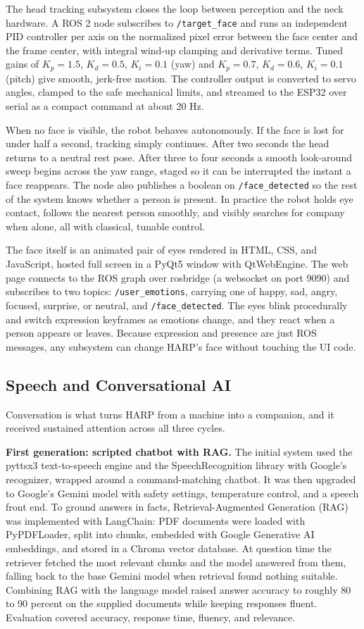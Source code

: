 \documentclass[11pt,a4paper]{article}
\begin{document}
The head tracking subsystem closes the loop between perception and the neck hardware. A ROS 2 node subscribes to \texttt{/target\_face} and runs an independent PID controller per axis on the normalized pixel error between the face center and the frame center, with integral wind-up clamping and derivative terms. Tuned gains of $K_p = 1.5$, $K_d = 0.5$, $K_i = 0.1$ (yaw) and $K_p = 0.7$, $K_d = 0.6$, $K_i = 0.1$ (pitch) give smooth, jerk-free motion. The controller output is converted to servo angles, clamped to the safe mechanical limits, and streamed to the ESP32 over serial as a compact command at about 20 Hz.

When no face is visible, the robot behaves autonomously. If the face is lost for under half a second, tracking simply continues. After two seconds the head returns to a neutral rest pose. After three to four seconds a smooth look-around sweep begins across the yaw range, staged so it can be interrupted the instant a face reappears. The node also publishes a boolean on \texttt{/face\_detected} so the rest of the system knows whether a person is present. In practice the robot holds eye contact, follows the nearest person smoothly, and visibly searches for company when alone, all with classical, tunable control.

The face itself is an animated pair of eyes rendered in HTML, CSS, and JavaScript, hosted full screen in a PyQt5 window with QtWebEngine. The web page connects to the ROS graph over rosbridge (a websocket on port 9090) and subscribes to two topics: \texttt{/user\_emotions}, carrying one of happy, sad, angry, focused, surprise, or neutral, and \texttt{/face\_detected}. The eyes blink procedurally and switch expression keyframes as emotions change, and they react when a person appears or leaves. Because expression and presence are just ROS messages, any subsystem can change HARP's face without touching the UI code.

\subsection{Speech and Conversational AI}

Conversation is what turns HARP from a machine into a companion, and it received sustained attention across all three cycles.

\textbf{First generation: scripted chatbot with RAG.} The initial system used the pyttsx3 text-to-speech engine and the SpeechRecognition library with Google's recognizer, wrapped around a command-matching chatbot. It was then upgraded to Google's Gemini model with safety settings, temperature control, and a speech front end. To ground answers in facts, Retrieval-Augmented Generation (RAG) was implemented with LangChain: PDF documents were loaded with PyPDFLoader, split into chunks, embedded with Google Generative AI embeddings, and stored in a Chroma vector database. At question time the retriever fetched the most relevant chunks and the model answered from them, falling back to the base Gemini model when retrieval found nothing suitable. Combining RAG with the language model raised answer accuracy to roughly 80 to 90 percent on the supplied documents while keeping responses fluent. Evaluation covered accuracy, response time, fluency, and relevance.
\end{document}
